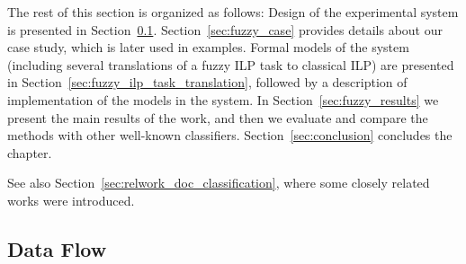 The rest of this section is organized as follows: Design of the experimental system is presented in Section~\ref{sec:fuzzy_system}. %
Section~\ref{sec:fuzzy_case} provides details about our case study, which is later used in examples. Formal models of the system (including several translations of a fuzzy ILP task to classical ILP) are presented in Section~\ref{sec:fuzzy_ilp_task_translation}, followed by a description of implementation of the models in the system. In Section~\ref{sec:fuzzy_results} we present the main results of the work, and then we evaluate and compare the methods with other well-known classifiers. Section~\ref{sec:conclusion} concludes the chapter.

See also Section~\ref{sec:relwork_doc_classification}, where some closely related works were introduced. 

 



\subsection{Data Flow} \label{sec:fuzzy_system}


